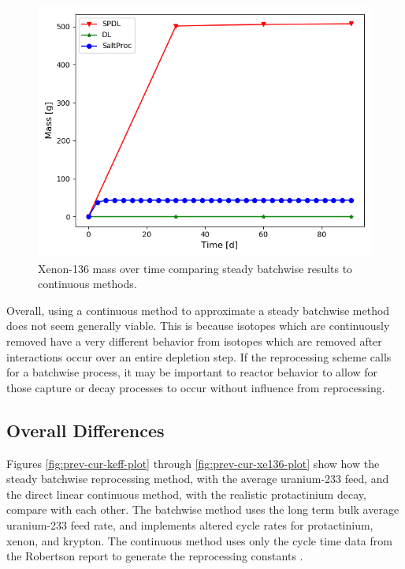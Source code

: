 \begin{figure}[H]
  \centering
  \includegraphics[scale=0.7]{images/soln-1-2-xe136.png}
  \caption{Xenon-136 mass over time comparing steady batchwise results to continuous methods.}
   \label{fig:steady-compare-xe136}
\end{figure}

Overall, using a continuous method to approximate a steady batchwise method does not seem generally viable. This is because isotopes which are continuously removed have a very different behavior from isotopes which are removed after interactions occur over an entire depletion step. If the reprocessing scheme calls for a batchwise process, it may be important to reactor behavior to allow for those capture or decay processes to occur without influence from reprocessing.

\subsection{Overall Differences}

Figures \ref{fig:prev-cur-keff-plot} through  \ref{fig:prev-cur-xe136-plot} show how the steady batchwise reprocessing method, with the average uranium-233 feed, and the direct linear continuous method, with the realistic protactinium decay, compare with each other.
The batchwise method uses the long term bulk average uranium-233 feed rate, and implements altered cycle rates for protactinium, xenon, and krypton. The continuous method uses only the cycle time data from the Robertson report to generate the reprocessing constants \cite{robertson_conceptual_1971}.

